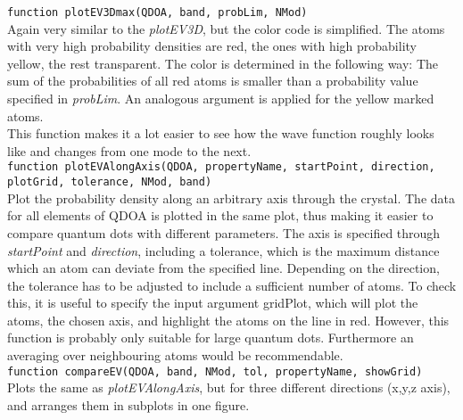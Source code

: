 \lstinline{function plotEV3Dmax(QDOA, band, probLim, NMod)}\\

Again very similar to the \textit{plotEV3D}, but the color code is simplified. The atoms with very high probability densities are red, the ones with high probability yellow, the rest transparent. The color is determined in the following way: The sum of the probabilities of all red atoms is smaller than a probability value specified in \textit{probLim}. An analogous argument is applied for the yellow marked atoms.\\
This function makes it a lot easier to see how the wave function roughly looks like and changes from one mode to the next.\\

\lstinline{function plotEVAlongAxis(QDOA, propertyName, startPoint, direction, plotGrid, tolerance, NMod, band)}\\

Plot the probability density along an arbitrary axis through the crystal. The data for all elements of QDOA is plotted in the same plot, thus making it easier to compare quantum dots with different parameters. The axis is specified through \textit{startPoint} and \textit{direction}, including a tolerance, which is  the maximum distance which an atom can deviate from the specified line. Depending on the direction, the tolerance has to be adjusted to include  a sufficient number of atoms. To check this, it is useful to specify the input argument gridPlot, which will plot the atoms, the chosen axis, and highlight  the atoms on the line in red. However, this function is probably only suitable for large quantum dots. Furthermore an averaging over neighbouring atoms  would be recommendable.\\
 
\lstinline{function compareEV(QDOA, band, NMod, tol, propertyName, showGrid)}\\

Plots the same as \textit{plotEVAlongAxis}, but for three different directions (x,y,z axis), and arranges them in subplots in one figure.
